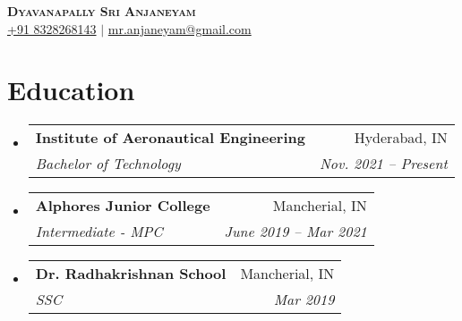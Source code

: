 \documentclass[letterpaper,11pt]{article}
\makeatletter
\newcommand{\resumeItem}[1]{
  \item\small{
    {#1 \vspace{-2pt}}
  }
}
\newcommand{\resumeSubheading}[4]{
  \vspace{-2pt}\item
    \begin{tabular*}{0.97\textwidth}[t]{l@{\extracolsep{\fill}}r}
      \textbf{#1} & #2 \\
      \textit{\small#3} & \textit{\small #4} \\
    \end{tabular*}\vspace{-7pt}
}
\newcommand{\resumeSubSubheading}[2]{
    \item
    \begin{tabular*}{0.97\textwidth}{l@{\extracolsep{\fill}}r}
      \textit{\small#1} & \textit{\small #2} \\
    \end{tabular*}\vspace{-7pt}
}
\newcommand{\resumeSubHeadingListStart}{\begin{itemize}[leftmargin=0.15in, label={}]}
\newcommand{\resumeSubHeadingListEnd}{\end{itemize}}
\newcommand{\resumeItemListStart}{\begin{itemize}}
\newcommand{\resumeItemListEnd}{\end{itemize}\vspace{-5pt}}
\makeatother
\begin{document}

\begin{center}
    \textbf{\Huge \scshape Dyavanapally Sri Anjaneyam} \\ \vspace{1pt}
    \href{tel:+918328268143}{\small +91 8328268143} $|$ \href{mailto:mr.anjaneyam@gmail.com}{mr.anjaneyam@gmail.com}

\end{center}


\section{Education}
  \resumeSubHeadingListStart
    \resumeSubheading
      {Institute of Aeronautical Engineering}{Hyderabad, IN}
      {Bachelor of Technology}{Nov. 2021 -- Present}
    \resumeSubheading
      {Alphores Junior College}{Mancherial, IN}
      {Intermediate - MPC}{June 2019 -- Mar 2021}
    \resumeSubheading
      {Dr. Radhakrishnan School}{Mancherial, IN}
      {SSC}{Mar 2019}
  \resumeSubHeadingListEnd



      
\end{document}

